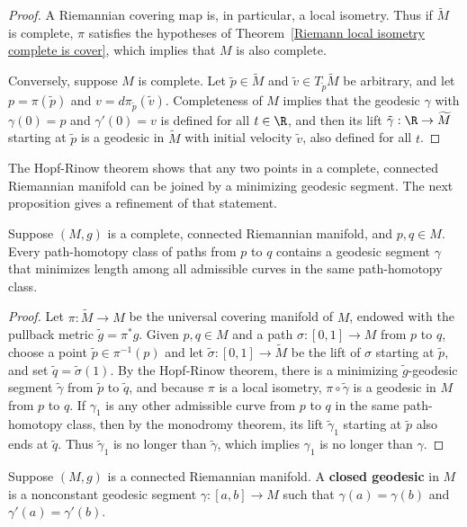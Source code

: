 \begin{proof}
A Riemannian covering map is, in particular, a local isometry. Thus if $\widetilde{M}$ is complete, $\pi$ satisfies the hypotheses of 
Theorem~\ref{Riemann local isometry complete is cover}, which implies that $M$ is also complete.\par
Conversely, suppose $M$ is complete. Let $\tilde{p}\in\widetilde{M}$ and $\tilde{v}\in T_{\tilde{p}}\widetilde{M}$ be arbitrary, and let $p=\pi(\tilde{p})$ and $v=d\pi_{\tilde{p}}(\tilde{v})$. Completeness of $M$ implies that the geodesic $\gamma$ with $\gamma(0)=p$ and $\gamma'(0)=v$ is defined for all $t\in\R$, and then its lift $\tilde{\gamma}:\R\to\widetilde{M}$ starting at $\tilde{p}$ is a geodesic in $\widetilde{M}$ with initial velocity $\tilde{v}$, also defined for all $t$.
\end{proof}
The Hopf-Rinow theorem shows that any two points in a complete, connected Riemannian manifold can be joined by a minimizing geodesic segment. The next proposition gives a refinement of that statement.
\begin{proposition}\label{Riemann geodesic in homotopy class}
Suppose $(M,g)$ is a complete, connected Riemannian manifold, and $p,q\in M$. Every path-homotopy class of paths from $p$ to $q$ contains a geodesic segment $\gamma$ that minimizes length among all admissible curves in the same path-homotopy class.
\end{proposition}
\begin{proof}
Let $\pi:\widetilde{M}\to M$ be the universal covering manifold of $M$, endowed with the pullback metric $\tilde{g}=\pi^*g$. Given $p,q\in M$ and a path $\sigma:[0,1]\to M$ from $p$ to $q$, choose a point $\tilde{p}\in\pi^{-1}(p)$ and let $\tilde{\sigma}:[0,1]\to\widetilde{M}$ be the lift of $\sigma$ starting at $\tilde{p}$, and set $\tilde{q}=\tilde{\sigma}(1)$. By the Hopf-Rinow theorem, there is a minimizing $\tilde{g}$-geodesic segment $\tilde{\gamma}$ from $\tilde{p}$ to $\tilde{q}$, and because $\pi$ is a local isometry, $\pi\circ\tilde{\gamma}$ is a geodesic in $M$ from $p$ to $q$. If $\gamma_1$ is any other admissible curve from $p$ to $q$ in the same path-homotopy class, then by the monodromy theorem, its lift $\tilde{\gamma}_1$ starting at $\tilde{p}$ also ends at $\tilde{q}$. Thus $\tilde{\gamma}_1$ is no longer than $\tilde{\gamma}$, which implies $\gamma_1$ is no longer than $\gamma$.
\end{proof}
Suppose $(M,g)$ is a connected Riemannian manifold. A \textbf{closed geodesic} in $M$ is a nonconstant geodesic segment $\gamma:[a,b]\to M$ such that $\gamma(a)=\gamma(b)$ and $\gamma'(a)=\gamma'(b)$.
